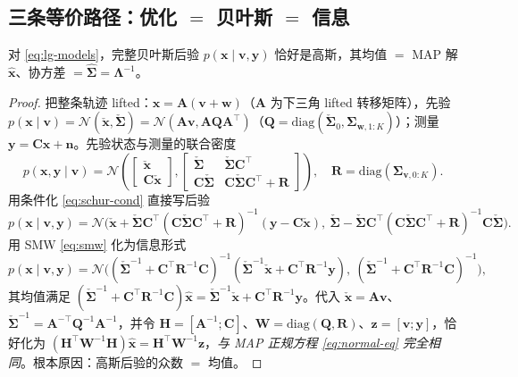 \subsection{三条等价路径：优化 $=$ 贝叶斯 $=$ 信息}
\label{sec:est-three-paths}

\begin{theorem}[线性高斯下 MAP $=$ 贝叶斯后验均值]\label{thm:map-bayes}
对 \cref{eq:lg-models}，完整贝叶斯后验 $p(\mathbf{x}\mid\mathbf{v},\mathbf{y})$ 恰好是高斯，其均值 $=$ MAP 解 $\hat{\mathbf{x}}$、协方差 $=\hat{\boldsymbol{\Sigma}}=\boldsymbol{\Lambda}^{-1}$。
\end{theorem}
\begin{proof}
把整条轨迹 lifted：$\mathbf{x}=\mathbf{A}(\mathbf{v}+\mathbf{w})$（$\mathbf{A}$ 为下三角 lifted 转移矩阵），先验 $p(\mathbf{x}\mid\mathbf{v})=\mathcal{N}(\check{\mathbf{x}},\check{\boldsymbol{\Sigma}})=\mathcal{N}(\mathbf{A}\mathbf{v},\mathbf{A}\mathbf{Q}\mathbf{A}^\top)$（$\mathbf{Q}=\mathrm{diag}(\check{\boldsymbol{\Sigma}}_0,\boldsymbol{\Sigma}_{\mathbf{w},1:K})$）；测量 $\mathbf{y}=\mathbf{C}\mathbf{x}+\mathbf{n}$。先验状态与测量的联合密度
\[
  p(\mathbf{x},\mathbf{y}\mid\mathbf{v})=\mathcal{N}\!\left(\begin{bmatrix}\check{\mathbf{x}}\\\mathbf{C}\check{\mathbf{x}}\end{bmatrix},
  \begin{bmatrix}\check{\boldsymbol{\Sigma}}&\check{\boldsymbol{\Sigma}}\mathbf{C}^\top\\\mathbf{C}\check{\boldsymbol{\Sigma}}&\mathbf{C}\check{\boldsymbol{\Sigma}}\mathbf{C}^\top+\mathbf{R}\end{bmatrix}\right),\quad \mathbf{R}=\mathrm{diag}(\boldsymbol{\Sigma}_{\mathbf{v},0:K}).
\]
用条件化 \cref{eq:schur-cond} 直接写后验
\[
  p(\mathbf{x}\mid\mathbf{v},\mathbf{y})=\mathcal{N}\Big(\check{\mathbf{x}}+\check{\boldsymbol{\Sigma}}\mathbf{C}^\top(\mathbf{C}\check{\boldsymbol{\Sigma}}\mathbf{C}^\top+\mathbf{R})^{-1}(\mathbf{y}-\mathbf{C}\check{\mathbf{x}}),\ \check{\boldsymbol{\Sigma}}-\check{\boldsymbol{\Sigma}}\mathbf{C}^\top(\mathbf{C}\check{\boldsymbol{\Sigma}}\mathbf{C}^\top+\mathbf{R})^{-1}\mathbf{C}\check{\boldsymbol{\Sigma}}\Big).
\]
用 SMW \cref{eq:smw} 化为信息形式
\[
  p(\mathbf{x}\mid\mathbf{v},\mathbf{y})=\mathcal{N}\Big((\check{\boldsymbol{\Sigma}}^{-1}+\mathbf{C}^\top\mathbf{R}^{-1}\mathbf{C})^{-1}(\check{\boldsymbol{\Sigma}}^{-1}\check{\mathbf{x}}+\mathbf{C}^\top\mathbf{R}^{-1}\mathbf{y}),\ (\check{\boldsymbol{\Sigma}}^{-1}+\mathbf{C}^\top\mathbf{R}^{-1}\mathbf{C})^{-1}\Big),
\]
其均值满足 $(\check{\boldsymbol{\Sigma}}^{-1}+\mathbf{C}^\top\mathbf{R}^{-1}\mathbf{C})\hat{\mathbf{x}}=\check{\boldsymbol{\Sigma}}^{-1}\check{\mathbf{x}}+\mathbf{C}^\top\mathbf{R}^{-1}\mathbf{y}$。代入 $\check{\mathbf{x}}=\mathbf{A}\mathbf{v}$、$\check{\boldsymbol{\Sigma}}^{-1}=\mathbf{A}^{-\top}\mathbf{Q}^{-1}\mathbf{A}^{-1}$，并令 $\mathbf{H}=[\mathbf{A}^{-1};\mathbf{C}]$、$\mathbf{W}=\mathrm{diag}(\mathbf{Q},\mathbf{R})$、$\mathbf{z}=[\mathbf{v};\mathbf{y}]$，恰好化为 $(\mathbf{H}^\top\mathbf{W}^{-1}\mathbf{H})\hat{\mathbf{x}}=\mathbf{H}^\top\mathbf{W}^{-1}\mathbf{z}$，\emph{与 MAP 正规方程 \cref{eq:normal-eq} 完全相同}。根本原因：高斯后验的众数 $=$ 均值。
\end{proof}

